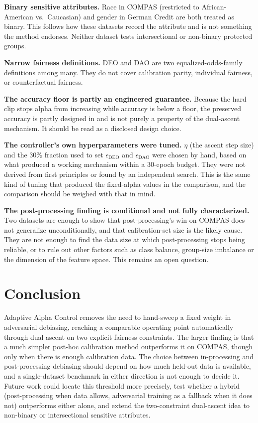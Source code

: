 \documentclass[11pt]{article}
\begin{document}
\textbf{Binary sensitive attributes.} Race in COMPAS (restricted to
African-American vs.\ Caucasian) and gender in German Credit are both
treated as binary. This follows how these datasets record the attribute
and is not something the method endorses. Neither dataset tests
intersectional or non-binary protected groups.

\textbf{Narrow fairness definitions.} DEO and DAO are two
equalized-odds-family definitions among many. They do not cover
calibration parity, individual fairness, or counterfactual fairness.

\textbf{The accuracy floor is partly an engineered guarantee.} Because
the hard clip stops alpha from increasing while accuracy is below a
floor, the preserved accuracy is partly designed in and is not purely a
property of the dual-ascent mechanism. It should be read as a disclosed
design choice.

\textbf{The controller's own hyperparameters were tuned.} $\eta$ (the
ascent step size) and the 30\% fraction used to set
$\epsilon_{\text{DEO}}$ and $\epsilon_{\text{DAO}}$ were chosen by hand,
based on what produced a working mechanism within a 30-epoch budget.
They were not derived from first principles or found by an independent
search. This is the same kind of tuning that produced the fixed-alpha
values in the comparison, and the comparison should be weighed with that
in mind.

\textbf{The post-processing finding is conditional and not fully
characterized.} Two datasets are enough to show that post-processing's
win on COMPAS does not generalize unconditionally, and that
calibration-set size is the likely cause. They are not enough to find
the data size at which post-processing stops being reliable, or to rule
out other factors such as class balance, group-size imbalance or the
dimension of the feature space. This remains an open question.

\section{Conclusion}

Adaptive Alpha Control removes the need to hand-sweep a fixed weight in
adversarial debiasing, reaching a comparable operating point
automatically through dual ascent on two explicit fairness constraints.
The larger finding is that a much simpler post-hoc calibration method
outperforms it on COMPAS, though only when there is enough calibration
data. The choice between in-processing and post-processing debiasing
should depend on how much held-out data is available, and a
single-dataset benchmark in either direction is not enough to decide it.
Future work could locate this threshold more precisely, test whether a
hybrid (post-processing when data allows, adversarial training as a
fallback when it does not) outperforms either alone, and extend the
two-constraint dual-ascent idea to non-binary or intersectional
sensitive attributes.
\end{document}
